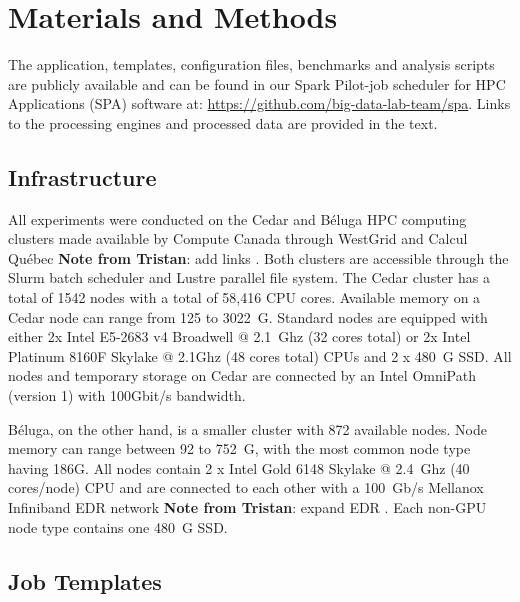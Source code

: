 \documentclass{IEEEtran}
\newcommand{\tristan}[1]{\color{red}\textbf{Note from Tristan}:
      #1 \color{black}}
\newcommand{\TG}[1]{\tristan{#1}}
\begin{document}
\section{Materials and Methods}\label{sec:methods}

    The application, templates, configuration files, benchmarks and
    analysis scripts are publicly available and can be found in our Spark
    Pilot-job scheduler for HPC Applications (SPA) software at:
    \href{https://github.com/big-data-lab-team/spa}{https://github.com/big-data-lab-team/spa}.
    Links to the processing engines and processed data are provided in the
    text.
    
    \subsection{Infrastructure}
    All experiments were conducted on the Cedar and B\'eluga HPC computing clusters
    made available by Compute Canada through WestGrid and Calcul Qu\'ebec \TG{add links}. Both 
    clusters are accessible through the Slurm batch scheduler and Lustre parallel file system.
    The Cedar cluster has a total of 1542 nodes
    with a total of 58,416 CPU cores. Available memory on a Cedar node can range
    from 125 to 3022~G. Standard nodes are equipped with either 2x Intel E5-2683 v4
    Broadwell @ 2.1~Ghz (32 cores total) or 2x Intel Platinum 8160F Skylake @
    2.1Ghz (48 cores total) CPUs and 
    2 x 480~G SSD. All nodes and temporary storage on Cedar are connected by an 
    Intel OmniPath (version 1) with 100Gbit/s bandwidth.

    B\'eluga, on the other hand, is a smaller cluster with 872 available nodes. 
    Node memory can range between 92 to 752~G, with the most common node type having 
    186G. All nodes contain 2 x Intel Gold 6148
    Skylake @ 2.4~Ghz (40 cores/node) CPU and are connected to each other with a
    100~Gb/s Mellanox Infiniband EDR network \TG{expand EDR}. Each non-GPU node type contains one 
    480~G SSD. 

    \subsection{Job Templates}
\end{document}
